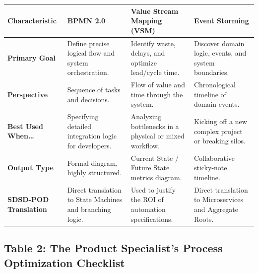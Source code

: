 \documentclass[
  11pt,
  openany,
  oneside]{book}
\begin{document}
\begin{longtable}[]{@{}
  >{\raggedright\arraybackslash}p{}
  >{\raggedright\arraybackslash}p{}
  >{\raggedright\arraybackslash}p{}
  >{\raggedright\arraybackslash}p{}@{}}
\toprule\noalign{}
\begin{minipage}[b]{\linewidth}\raggedright
Characteristic
\end{minipage} & \begin{minipage}[b]{\linewidth}\raggedright
BPMN 2.0
\end{minipage} & \begin{minipage}[b]{\linewidth}\raggedright
Value Stream Mapping (VSM)
\end{minipage} & \begin{minipage}[b]{\linewidth}\raggedright
Event Storming
\end{minipage} \\
\midrule\noalign{}
\endhead
\bottomrule\noalign{}
\endlastfoot
\textbf{Primary Goal} & Define precise logical flow and system
orchestration. & Identify waste, delays, and optimize lead/cycle time. &
Discover domain logic, events, and system boundaries. \\
\textbf{Perspective} & Sequence of tasks and decisions. & Flow of value
and time through the system. & Chronological timeline of domain
events. \\
\textbf{Best Used When\ldots{}} & Specifying detailed integration logic
for developers. & Analyzing bottlenecks in a physical or mixed workflow.
& Kicking off a new complex project or breaking silos. \\
\textbf{Output Type} & Formal diagram, highly structured. & Current
State / Future State metrics diagram. & Collaborative sticky-note
timeline. \\
\textbf{SDSD-POD Translation} & Direct translation to State Machines and
branching logic. & Used to justify the ROI of automation specifications.
& Direct translation to Microservices and Aggregate Roots. \\
\end{longtable}

\subsection{Table 2: The Product Specialist's Process Optimization
Checklist}\label{table-2-the-product-specialists-process-optimization-checklist}
\end{document}
